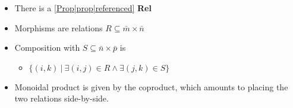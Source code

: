 
\begin{itemize}
    \item There is a \ref{Prop|prop|referenced} \textbf{Rel}
    \item Morphisms are relations $R \subseteq \bar m \times \bar n$
    \item Composition with $S \subseteq \bar n \times \bar p$ is
          \begin{itemize}
            \item $\{(i, k)\ |\  \exists (i, j) \in R \land \exists (j,k) \in S\}$
          \end{itemize}
    \item Monoidal product is given by the coproduct, which amounts to placing the two relations side-by-side.
  \end{itemize}